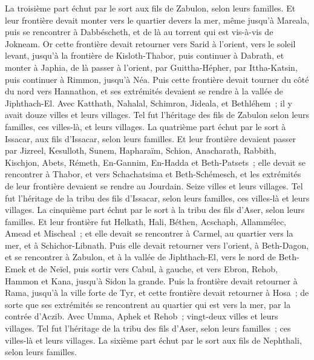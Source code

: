 \begin{multicols}{2}
La troisième part échut par le sort aux fils de Zabulon, selon leurs familles.
Et leur frontière devait monter vers le quartier devers la mer, même jusqu'à Mareala, puis se rencontrer à Dabbéscheth, et de là au torrent qui est vis-à-vis de Jokneam.
Or cette frontière devait retourner vers Sarid à l'orient, vers le soleil levant, jusqu'à la frontière de Kisloth-Thabor, puis continuer à Dabrath, et monter à Japhia,
de là passer à l'orient, par Guittha-Hépher, par Ittha-Katsin, puis continuer à Rimmon, jusqu'à Néa.
Puis cette frontière devait tourner du côté du nord vers Hannathon, et ses extrémités devaient se rendre à la vallée de Jiphthach-El.
Avec Katthath, Nahalal, Schimron, Jideala, et Bethléhem~; il y avait douze villes et leurs villages.
Tel fut l'héritage des fils de Zabulon selon leurs familles, ces villes-là, et leurs villages.
La quatrième part échut par le sort à Issacar, aux fils d'Issacar, selon leurs familles.
Et leur frontière devaient passer par Jizreel, Kesulloth, Sunem,
Hapharaïm, Schion, Anacharath,
Rabbith, Kischjon, Abets,
Rémeth, En-Gannim, En-Hadda et Beth-Patsets~;
elle devait se rencontrer à Thabor, et vers Schachatsima et Beth-Schémesch, et les extrémités de leur frontière devaient se rendre au Jourdain. Seize villes et leurs villages.
Tel fut l'héritage de la tribu des fils d'Issacar, selon leurs familles, ces villes-là et leurs villages.
La cinquième part échut par le sort à la tribu des fils d'Aser, selon leurs familles.
Et leur frontière fut Helkath, Hali, Béthen, Acschaph,
Allammélec, Amead et Mischeal~; et elle devait se rencontrer à Carmel, au quartier vers la mer, et à Schichor-Libnath.
Puis elle devait retourner vers l'orient, à Beth-Dagon, et se rencontrer à Zabulon, et à la vallée de Jiphthach-El, vers le nord de Beth-Emek et de Neïel, puis sortir vers Cabul, à gauche,
et vers Ebron, Rehob, Hammon et Kana, jusqu'à Sidon la grande.
Puis la frontière devait retourner à Rama, jusqu'à la ville forte de Tyr, et cette frontière devait retourner à Hosa~; de sorte que ses extrémités se rencontrent au quartier qui est vers la mer, par la contrée d'Aczib.
Avec Umma, Aphek et Rehob~; vingt-deux villes et leurs villages.
Tel fut l'héritage de la tribu des fils d'Aser, selon leurs familles~; ces villes-là et leurs villages.
La sixième part échut par le sort aux fils de Nephthali, selon leurs familles.

\end{multicols}
